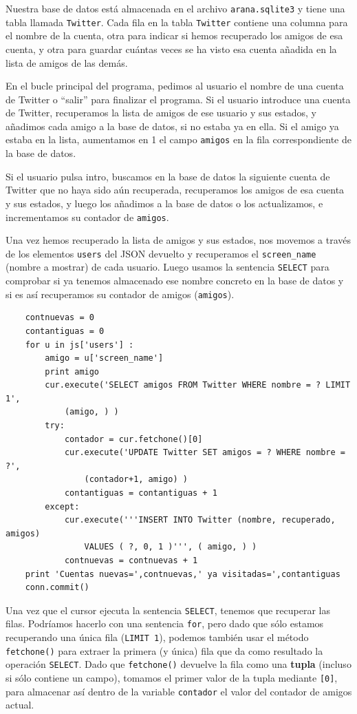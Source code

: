 \afterverb
%
Nuestra base de datos está almacenada en el archivo {\tt arana.sqlite3} y tiene
una tabla llamada {\tt Twitter}. Cada fila en la tabla {\tt Twitter}
contiene una columna para el nombre de la cuenta, otra para indicar si hemos recuperado los
amigos de esa cuenta, y otra para guardar cuántas veces se ha visto esa cuenta añadida en
la lista de amigos de las demás.

En el bucle principal del programa, pedimos al usuario el nombre de una cuenta
de Twitter o ``salir'' para finalizar el programa.
Si el usuario introduce una cuenta de Twitter, recuperamos la
lista de amigos de ese usuario y sus estados,
y añadimos cada amigo a la base de datos, si no
estaba ya en ella. Si el amigo ya estaba en la lista,
aumentamos en 1 el campo {\tt amigos} en la fila correspondiente de la base de datos.

Si el usuario pulsa intro, buscamos en la base de datos la siguiente
cuenta de Twitter que no haya sido aún recuperada, recuperamos los
amigos de esa cuenta y sus estados, y luego los añadimos a la base de datos
o los actualizamos, e incrementamos su contador de {\tt amigos}.

Una vez hemos recuperado la lista de amigos y sus estados, nos movemos
a través de los elementos {\tt users} del JSON devuelto
y recuperamos el \verb"screen_name" (nombre a mostrar) de cada usuario. Luego usamos
la sentencia {\tt SELECT} para comprobar si ya tenemos almacenado ese
nombre concreto en la base de datos y si es así recuperamos su
contador de amigos ({\tt amigos}).

\beforeverb
\begin{verbatim}
    contnuevas = 0
    contantiguas = 0
    for u in js['users'] :
	    amigo = u['screen_name']
	    print amigo
	    cur.execute('SELECT amigos FROM Twitter WHERE nombre = ? LIMIT 1', 
		    (amigo, ) )
	    try:
		    contador = cur.fetchone()[0]
		    cur.execute('UPDATE Twitter SET amigos = ? WHERE nombre = ?', 
			    (contador+1, amigo) )
		    contantiguas = contantiguas + 1
		except:
		    cur.execute('''INSERT INTO Twitter (nombre, recuperado, amigos) 
			    VALUES ( ?, 0, 1 )''', ( amigo, ) )
		    contnuevas = contnuevas + 1
    print 'Cuentas nuevas=',contnuevas,' ya visitadas=',contantiguas
    conn.commit()
\end{verbatim}
\afterverb
%
Una vez que el cursor ejecuta la sentencia {\tt SELECT},
tenemos que recuperar las filas. Podríamos hacerlo con una sentencia {\tt for},
pero dado que sólo estamos recuperando una única fila
({\tt LIMIT 1}), podemos también usar el método {\tt fetchone()} para extraer
la primera (y única) fila que da como resultado la operación {\tt SELECT}.
Dado que {\tt fetchone()} devuelve la fila como una {\bf tupla} (incluso si sólo
contiene un campo), tomamos el primer valor de la tupla mediante {\tt [0]}, para
almacenar así dentro de la variable {\tt contador} el valor del contador de amigos actual.

